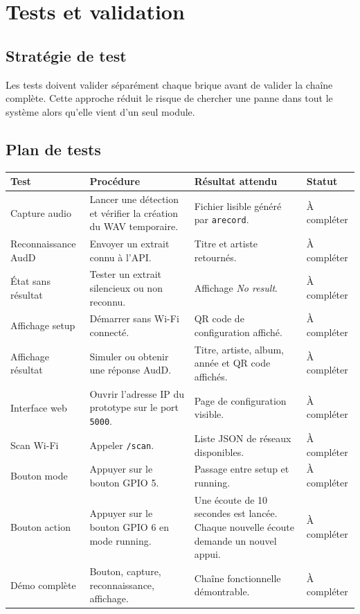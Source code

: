 \section{Tests et validation}

\subsection{Stratégie de test}

Les tests doivent valider séparément chaque brique avant de valider la chaîne
complète. Cette approche réduit le risque de chercher une panne dans tout le
système alors qu'elle vient d'un seul module.

\subsection{Plan de tests}

\begin{longtable}{|p{3cm}|p{4cm}|p{4cm}|p{2cm}|}
\hline
\textbf{Test} & \textbf{Procédure} & \textbf{Résultat attendu} & \textbf{Statut} \\
\hline
Capture audio & Lancer une détection et vérifier la création du WAV temporaire. &
Fichier lisible généré par \texttt{arecord}. & À compléter \\
\hline
Reconnaissance AudD & Envoyer un extrait connu à l'API. &
Titre et artiste retournés. & À compléter \\
\hline
État sans résultat & Tester un extrait silencieux ou non reconnu. &
Affichage \textit{No result}. & À compléter \\
\hline
Affichage setup & Démarrer sans Wi-Fi connecté. &
QR code de configuration affiché. & À compléter \\
\hline
Affichage résultat & Simuler ou obtenir une réponse AudD. &
Titre, artiste, album, année et QR code affichés. & À compléter \\
\hline
Interface web & Ouvrir l'adresse IP du prototype sur le port \texttt{5000}. &
Page de configuration visible. & À compléter \\
\hline
Scan Wi-Fi & Appeler \texttt{/scan}. &
Liste JSON de réseaux disponibles. & À compléter \\
\hline
Bouton mode & Appuyer sur le bouton GPIO 5. &
Passage entre setup et running. & À compléter \\
\hline
Bouton action & Appuyer sur le bouton GPIO 6 en mode running. &
Une écoute de 10 secondes est lancée. Chaque nouvelle écoute demande un nouvel appui. & À compléter \\
\hline
Démo complète & Bouton, capture, reconnaissance, affichage. &
Chaîne fonctionnelle démontrable. & À compléter \\
\hline
\end{longtable}

